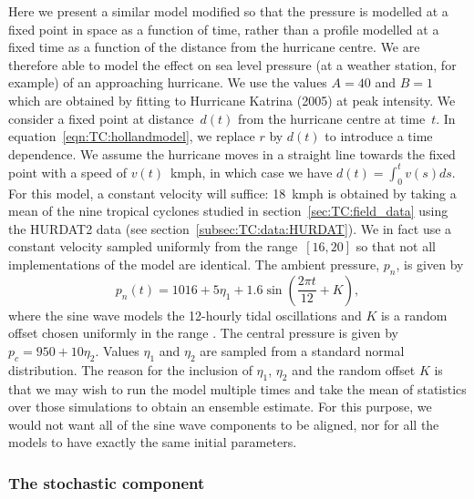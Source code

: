 Here we present a similar model modified so that the pressure is modelled at a fixed point in space as a function of time, rather than a profile modelled at a fixed time as a function of the distance from the hurricane centre. We are therefore able to model the effect on sea level pressure (at a weather station, for example) of an approaching hurricane. 
We use the values $A=40$ and $B=1$ which are obtained by fitting to Hurricane Katrina (2005) at peak intensity. We consider a fixed point at distance~$d(t)$ from the hurricane centre at time~$t$. In equation~\ref{eqn:TC:hollandmodel}, we replace $r$ by $d(t)$ to introduce a time dependence. We assume the hurricane moves in a straight line towards the fixed point with a speed of $v(t)$~kmph, in which case we have $d(t) = \int_0^t v(s) ds$. For this model, a constant velocity will suffice: 18~kmph is obtained by taking a mean of the nine tropical cyclones studied in section~\ref{sec:TC:field_data} using the HURDAT2 data (see section~\ref{subsec:TC:data:HURDAT}). We in fact use a constant velocity sampled uniformly from the range~$[16,20]$ so that not all implementations of the model are identical. The ambient pressure, $p_n$, is given by 
	\begin{equation}
		p_n(t) = 1016 + 5\eta_1 + 1.6\sin\left(\frac{2\pi t}{12} + K\right),
	\label{eqn:TC:ambientpressure}
	\end{equation} 
where the sine wave models the 12-hourly tidal oscillations and $K$ is a random offset chosen uniformly in the range {\Red{$[0,2\pi]$}}. The central pressure is given by $p_c = 950+10\eta_2$. Values $\eta_1$ and $\eta_2$ are sampled from a standard normal distribution. The reason for the inclusion of $\eta_1$, $\eta_2$ and the random offset $K$ is that we may wish to run the model multiple times and take the mean of statistics over those simulations to obtain an ensemble estimate. For this purpose, we would not want all of the sine wave components to be aligned, nor for all the models to have exactly the same initial parameters.

\subsubsection{The stochastic component}

{}

